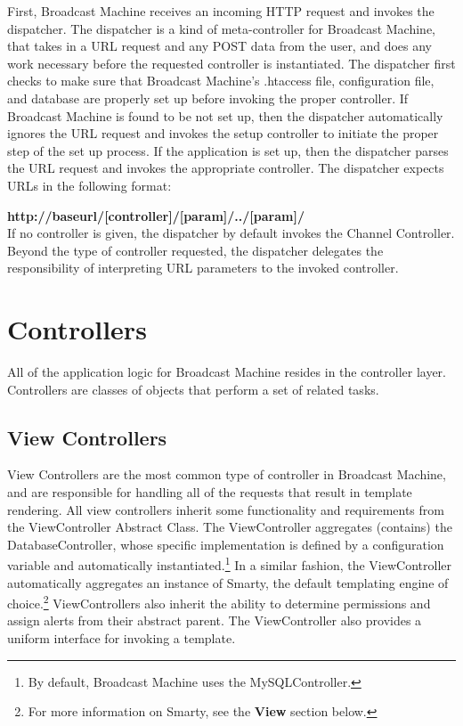 \documentclass[a4paper,12pt]{report}
\begin{document}
First, Broadcast Machine receives an incoming HTTP request and invokes the dispatcher. The dispatcher is a kind of meta-controller for Broadcast Machine, that takes in a URL request and any POST data from the user, and does any work necessary before the requested controller is instantiated. The dispatcher first checks to make sure that Broadcast Machine's .htaccess file, configuration file, and database are properly set up before invoking the proper controller. If Broadcast Machine is found to be not set up, then the dispatcher automatically ignores the URL request and invokes the setup controller to initiate the proper step of the set up process. If the application is set up, then the dispatcher parses the URL request and invokes the appropriate controller. The dispatcher expects URLs in the following format:

\textbf{http://baseurl/[controller]/[param]/../[param]/} \\

If no controller is given, the dispatcher by default invokes the Channel Controller. Beyond the type of controller requested, the dispatcher delegates the responsibility of interpreting URL parameters to the invoked controller.

\section{Controllers}

All of the application logic for Broadcast Machine resides in the controller layer. Controllers are classes of objects that perform a set of related tasks. 

\subsection*{View Controllers}
View Controllers are the most common type of controller in Broadcast Machine, and are responsible for handling all of the requests that result in template rendering. All view controllers inherit some functionality and requirements from the ViewController Abstract Class. The ViewController aggregates (contains) the DatabaseController, whose specific implementation is defined by a configuration variable and automatically instantiated.\footnote{By default, Broadcast Machine uses the MySQLController.} In a similar fashion, the ViewController automatically aggregates an instance of Smarty, the default templating engine of choice.\footnote{For more information on Smarty, see the \textbf{View} section below.} ViewControllers also inherit the ability to determine permissions and assign alerts from their abstract parent. The ViewController also provides a uniform interface for invoking a template.
\end{document}
